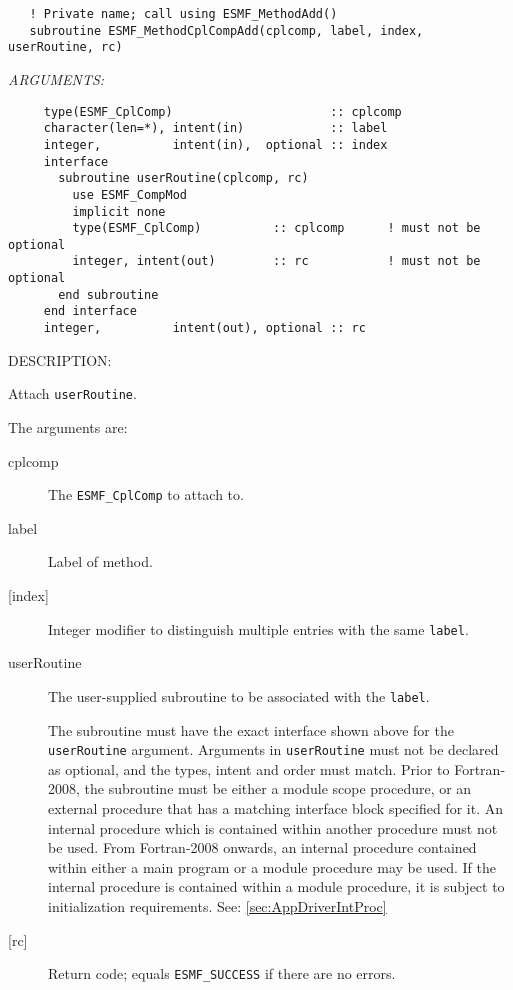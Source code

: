   
\begin{verbatim}   ! Private name; call using ESMF_MethodAdd()
   subroutine ESMF_MethodCplCompAdd(cplcomp, label, index, userRoutine, rc)\end{verbatim}{\em ARGUMENTS:}
\begin{verbatim}     type(ESMF_CplComp)                      :: cplcomp
     character(len=*), intent(in)            :: label
     integer,          intent(in),  optional :: index
     interface
       subroutine userRoutine(cplcomp, rc)
         use ESMF_CompMod
         implicit none
         type(ESMF_CplComp)          :: cplcomp      ! must not be optional
         integer, intent(out)        :: rc           ! must not be optional
       end subroutine
     end interface
     integer,          intent(out), optional :: rc \end{verbatim}
{\sf DESCRIPTION:\\ }


   Attach {\tt userRoutine}.
  
   The arguments are:
   \begin{description}
   \item[cplcomp]
     The {\tt ESMF\_CplComp} to attach to.
   \item[label]
     Label of method.
   \item[{[index]}]
     Integer modifier to distinguish multiple entries with the same {\tt label}.
   \item[userRoutine]
     The user-supplied subroutine to be associated with the {\tt label}.
  
     The subroutine must have the exact interface shown above
     for the {\tt userRoutine} argument. Arguments in {\tt userRoutine}
     must not be declared as optional, and the types, intent and order must
     match.
     Prior to Fortran-2008, the subroutine must be either a module scope procedure,
     or an external procedure that has a matching interface block specified for it.
     An internal procedure which is contained within another procedure must not be used.
     From Fortran-2008 onwards, an internal procedure contained within either a main program
     or a module procedure may be used.  If the internal procedure is contained within a
     module procedure, it is subject to initialization requirements.  See: \ref{sec:AppDriverIntProc}
   \item[{[rc]}]
     Return code; equals {\tt ESMF\_SUCCESS} if there are no errors.
   \end{description}
   
